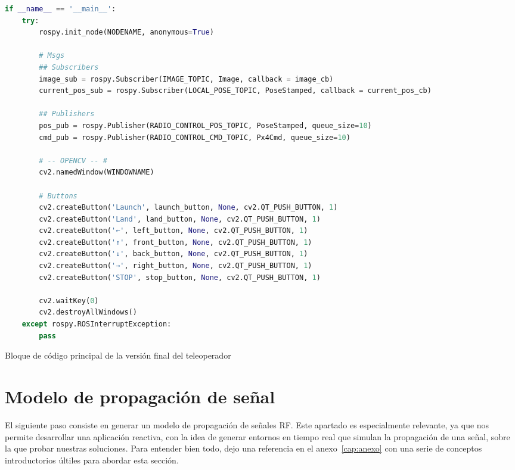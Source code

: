 \begin{code}[t]
\begin{lstlisting}[language=Python]
if __name__ == '__main__':
    try:
        rospy.init_node(NODENAME, anonymous=True)

        # Msgs
        ## Subscribers
        image_sub = rospy.Subscriber(IMAGE_TOPIC, Image, callback = image_cb)
        current_pos_sub = rospy.Subscriber(LOCAL_POSE_TOPIC, PoseStamped, callback = current_pos_cb)

        ## Publishers
        pos_pub = rospy.Publisher(RADIO_CONTROL_POS_TOPIC, PoseStamped, queue_size=10)
        cmd_pub = rospy.Publisher(RADIO_CONTROL_CMD_TOPIC, Px4Cmd, queue_size=10)

        # -- OPENCV -- #
        cv2.namedWindow(WINDOWNAME)

        # Buttons
        cv2.createButton('Launch', launch_button, None, cv2.QT_PUSH_BUTTON, 1)
        cv2.createButton('Land', land_button, None, cv2.QT_PUSH_BUTTON, 1)
        cv2.createButton('←', left_button, None, cv2.QT_PUSH_BUTTON, 1)
        cv2.createButton('↑', front_button, None, cv2.QT_PUSH_BUTTON, 1)
        cv2.createButton('↓', back_button, None, cv2.QT_PUSH_BUTTON, 1)
        cv2.createButton('→', right_button, None, cv2.QT_PUSH_BUTTON, 1)
        cv2.createButton('STOP', stop_button, None, cv2.QT_PUSH_BUTTON, 1)

        cv2.waitKey(0)
        cv2.destroyAllWindows()
    except rospy.ROSInterruptException:
        pass
\end{lstlisting}
\caption[Bloque de código principal de la versión final del teleoperador]{Bloque de código principal de la versión final del teleoperador}
\label{cod:c2c_app}
\end{code}

\section{Modelo de propagación de señal}
\label{sec:signals}

El siguiente paso consiste en generar un modelo de propagación de señales \ac{RF}. Este apartado es especialmente relevante, ya que nos permite desarrollar una aplicación reactiva, con la idea de generar entornos en tiempo real que simulan la propagación de una señal, sobre la que probar nuestras soluciones. Para entender bien todo, dejo una referencia en el anexo~\ref{cap:anexo} con una serie de conceptos introductorios últiles para abordar esta sección.\\

